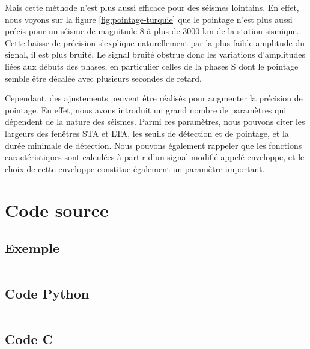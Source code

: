 \documentclass[a4paper, 11pt]{article} %
\begin{document}
Mais cette méthode n'est plus aussi efficace pour des séismes lointains. En effet, nous voyons sur la figure \ref{fig:pointage-turquie} que le pointage n'est plus aussi précis pour un séisme de magnitude 8 à plus de 3000 km de la station sismique. Cette baisse de précision s'explique naturellement par la plus faible amplitude du signal, il est plus bruité. Le signal bruité obstrue donc les variations d'amplitudes liées aux débuts des phases, en particulier celles de la phases S dont le pointage semble être décalée avec plusieurs secondes de retard. 

Cependant, des ajustements peuvent être réalisés pour augmenter la précision de pointage. En effet, nous avons introduit un grand nombre de paramètres qui dépendent de la nature des séismes. Parmi ces paramètres, nous pouvons citer les largeurs des fenêtres STA et LTA, les seuils de détection et de pointage, et la durée minimale de détection. Nous pouvons également rappeler que les fonctions caractéristiques sont calculées à partir d'un signal modifié appelé enveloppe, et le choix de cette enveloppe constitue également un paramètre important. 

\section{Code source}

\subsection{Exemple}

\inputminted[fontsize=\small,linenos]{python}{./code/sample.py}

\subsection{Code Python}

\inputminted[fontsize=\footnotesize,linenos]{python}{./code/picker.py}

\subsection{Code C}

\inputminted[fontsize=\footnotesize,linenos]{c}{./code/stalta.c}

\newpage 



\end{document}
